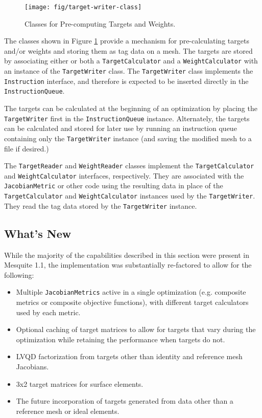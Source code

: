 \documentclass{article}
\begin{document}
\begin{figure}[htb]
\begin{center}
\texttt{[image: fig/target-writer-class]}
\caption{Classes for Pre-computing Targets and Weights.\label{fig:targetwriter}}
\end{center}
\end{figure}

The classes shown in Figure \ref{fig:targetwriter} provide a mechanism for pre-calculating targets and/or weights and storing them as tag data on a mesh.  The targets are stored by associating either or both a \texttt{TargetCalculator} and a \texttt{WeightCalculator} with an instance of the \texttt{TargetWriter} class.  The \texttt{TargetWriter} class implements the \texttt{Instruction} interface, and therefore is expected to be inserted directly in the \texttt{InstructionQueue}.  

The targets can be calculated at the beginning of an optimization by placing the \texttt{TargetWriter} first in the \texttt{InstructionQueue} instance.  Alternately, the targets can be calculated and stored for later use by running an instruction queue containing only the \texttt{TargetWriter} instance (and saving the modified mesh to a file if desired.)

The \texttt{TargetReader} and \texttt{WeightReader} classes implement the \texttt{TargetCalculator} and \texttt{WeightCalculator} interfaces, respectively.  They are associated with the \texttt{JacobianMetric} or other code using the resulting data in place of the \texttt{TargetCalculator} and \texttt{WeightCalculator} instances used by the \texttt{TargetWriter}.  They read the tag data stored by the \texttt{TargetWriter} instance.

\subsection{What's New}

While the majority of the capabilities described in this section were present in Mesquite 1.1, the implementation was substantially re-factored to allow for the following:
\begin{itemize}
\item Multiple \texttt{JacobianMetrics} active in a single optimization (e.g. composite metrics or composite objective functions), with different target calculators used by each metric.
\item Optional caching of target matrices to allow for targets that vary during the optimization while retaining the performance when targets do not.
\item LVQD factorization from targets other than identity and reference mesh Jacobians.
\item 3x2 target matrices for surface elements.
\item The future incorporation of targets generated from data other than a reference mesh or ideal elements.
\end{itemize}
\end{document}
